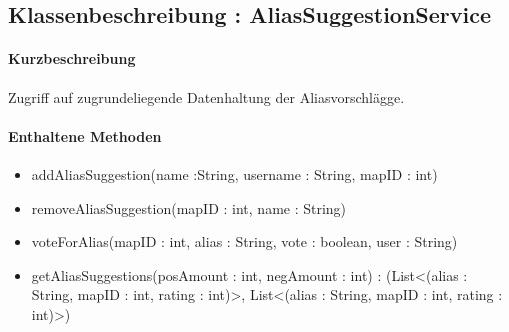 \subsection{Klassenbeschreibung : AliasSuggestionService}%
\paragraph*{Kurzbeschreibung}
Zugriff auf zugrundeliegende Datenhaltung der Aliasvorschlägge.
\paragraph*{Enthaltene Methoden}
\begin{itemize}
    \item addAliasSuggestion(name :String, username : String, mapID : int)
    \item removeAliasSuggestion(mapID : int, name : String)
    \item voteForAlias(mapID : int, alias : String, vote : boolean, user : String)
    \item getAliasSuggestions(posAmount : int, negAmount : int) : (List<(alias : String, mapID : int, rating : int)>, List<(alias : String, mapID : int, rating : int)>)
\end{itemize}
